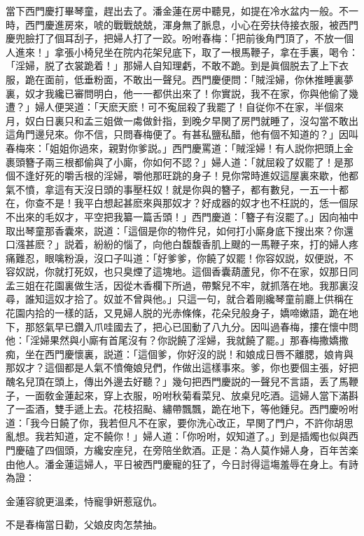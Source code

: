 當下西門慶打畢琴童，趕出去了。潘金蓮在房中聽見，如提在冷水盆内一般。不一時，西門慶進房來，唬的戰戰兢兢，渾身無了脈息，小心在旁扶侍接衣服，被西門慶兜臉打了個耳刮子，把婦人打了一跤。吩咐春梅：「把前後角門頂了，不放一個人進來！」拿張小椅兒坐在院内花架兒底下，取了一根馬鞭子，拿在手裏，喝令：「淫婦，脱了衣裳跪着！」那婦人自知理虧，不敢不跪。到是眞個脱去了上下衣服，跪在面前，低垂粉面，不敢出一聲兒。西門慶便問：「賊淫婦，你休推睡裏夢裏，奴才我纔已審問明白，他一一都供出來了！你實説，我不在家，你與他偷了幾遭？」婦人便哭道：「天麽天麽！可不寃屈殺了我罷了！自従你不在家，半個來月，奴白日裏只和孟三姐做一䖏做針指，到晚夕早関了房門就睡了，沒勾當不敢出這角門邊兒來。你不信，只問春梅便了。有甚私鹽私醋，他有個不知道的？」因叫春梅來：「姐姐你過來，親對你爹説。」西門慶罵道：「賊淫婦！有人説你把頭上金裹頭簪子兩三根都偷與了小廝，你如何不認？」婦人道：「就屈殺了奴罷了！是那個不逢好死的嚼舌根的淫婦，嚼他那旺跳的身子！見你常時進奴這屋裏來歇，他都氣不憤，拿這有天沒日頭的事壓枉奴！就是你與的簪子，都有數兒，一五一十都在，你查不是！我平白想起甚麽來與那奴才？好成器的奴才也不枉説的，恁一個尿不出來的毛奴才，平空把我纂一篇舌頭！」西門慶道：「簪子有沒罷了。」因向袖中取出琴童那香囊來，説道：「這個是你的物件兒，如何打小廝身底下搜出來？你還口漒甚麽？」説着，紛紛的惱了，向他白馥馥香肌上颼的一馬鞭子來，打的婦人疼痛難忍，眼噙粉淚，沒口子叫道：「好爹爹，你饒了奴罷！你容奴説，奴便説，不容奴説，你就打死奴，也只臭煙了這塊地。這個香囊葫蘆兒，你不在家，奴那日同孟三姐在花園裏做生活，因從木香欄下所過，帶繫兒不牢，就抓落在地。我那裏沒尋，誰知這奴才拾了。奴並不曾與他。」只這一句，就合着剛纔琴童前廳上供稱在花園内拾的一樣的話，又見婦人脱的光赤條條，花朵兒般身子，嬌啼嫩語，跪在地下，那怒氣早已鑽入爪哇國去了，把心已囬動了八九分。因叫過春梅，摟在懷中問他：「淫婦果然與小廝有首尾沒有？你説饒了淫婦，我就饒了罷。」那春梅撒嬌撒痴，坐在西門慶懷裏，説道：「這個爹，你好沒的説！和娘成日唇不離腮，娘肯與那奴才？這個都是人氣不憤俺娘兒們，作做出這樣事來。爹，你也要個主張，好把醜名兒頂在頭上，傳出外邊去好聽？」幾句把西門慶説的一聲兒不言語，丢了馬鞭子，一面敎金蓮起來，穿上衣服，吩咐秋菊看菜兒、放桌兒吃酒。這婦人當下滿斟了一盃酒，雙手遞上去。花枝招颭、繡帶飄飄，跪在地下，等他鍾兒。西門慶吩咐道：「我今日饒了你，我若但凡不在家，要你洗心改正，早関了門户，不許你胡思亂想。我若知道，定不饒你！」婦人道：「你吩咐，奴知道了。」到是插燭也似與西門慶磕了四個頭，方纔安座兒，在旁陪坐飲酒。正是：為人莫作婦人身，百年苦楽由他人。潘金蓮這婦人，平日被西門慶寵的狂了，今日討得這塲羞辱在身上。有詩為證：

\begin{myquote}
金蓮容貌更溫柔，恃寵爭姸惹寇仇。

不是春梅當日勸，父娘皮肉怎禁抽。
\end{myquote}

